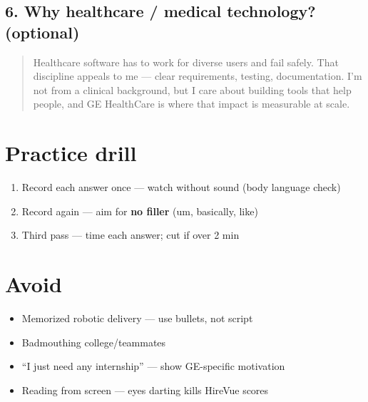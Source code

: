 \documentclass[11pt,a4paper]{article}
\newcommand{\Q}[1]{\textbf{\color{q}#1}}
\newcommand{\Say}[1]{\begin{quote}\small #1\end{quote}}
\begin{document}
\subsection{\Q{6. Why healthcare / medical technology?} (optional)}
\Say{
Healthcare software has to work for diverse users and fail safely. That discipline appeals to me --- clear requirements, testing, documentation. I'm not from a clinical background, but I care about building tools that help people, and GE HealthCare is where that impact is measurable at scale.
}

\section{Practice drill}
\begin{enumerate}
  \item Record each answer once --- watch without sound (body language check)
  \item Record again --- aim for \textbf{no filler} (um, basically, like)
  \item Third pass --- time each answer; cut if over 2 min
\end{enumerate}

\section{Avoid}
\begin{itemize}
  \item Memorized robotic delivery --- use bullets, not script
  \item Badmouthing college/teammates
  \item ``I just need any internship'' --- show GE-specific motivation
  \item Reading from screen --- eyes darting kills HireVue scores
\end{itemize}
\end{document}
